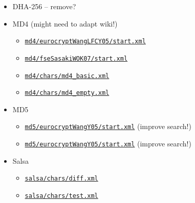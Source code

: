 \documentclass[11pt, a4paper]{article}
\newcommand{\hashlink}[2][black]{\href{https://extgit.iaik.tugraz.at/krypto/nldtool/blob/master/hash/#2}{\color{#1}\nolinkurl{#2}}}
\begin{document}
\begin{itemize}
\begin{itemize}
  \item DHA-256 -- remove?
  \item MD4 (might need to adapt wiki!)
    \begin{itemize}
      \item \hashlink[todo]{md4/eurocryptWangLFCY05/start.xml}
      \item \hashlink[todo]{md4/fseSasakiWOK07/start.xml}
      \item \hashlink[todo]{md4/chars/md4_basic.xml}
      \item \hashlink[todo]{md4/chars/md4_empty.xml}
    \end{itemize}
  \item MD5
    \begin{itemize}
      \item \hashlink[todo]{md5/eurocryptWangY05/start.xml} (improve search!)
      \item \hashlink[todo]{md5/eurocryptWangY05/start.xml} (improve search!)
    \end{itemize}
  \item Salsa
    \begin{itemize}
      \item \hashlink[todo]{salsa/chars/diff.xml}
      \item \hashlink[todo]{salsa/chars/test.xml}
    \end{itemize}

\end{itemize}
\end{itemize}
\end{document}
